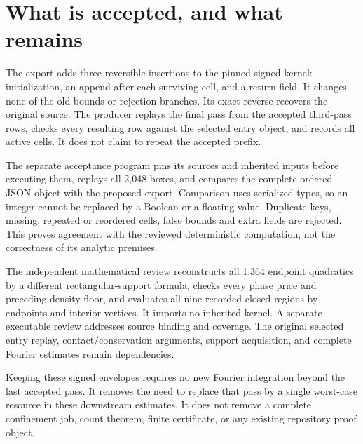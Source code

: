 \documentclass[11pt]{article}
\begin{document}
\section{What is accepted, and what remains}
The export adds three reversible insertions to the pinned signed kernel:
initialization, an append after each surviving cell, and a return field.
It changes none of the old bounds or rejection branches.
Its exact reverse recovers the original source.
The producer replays the final pass from the accepted third-pass rows,
checks every resulting row against the selected entry object, and records
all active cells. It does not claim to repeat the accepted prefix.

The separate acceptance program pins its sources and inherited inputs
before executing them, replays all 2,048 boxes, and compares the complete
ordered JSON object with the proposed export. Comparison uses serialized
types, so an integer cannot be replaced by a Boolean or a floating value.
Duplicate keys, missing, repeated or reordered cells, false bounds and
extra fields are rejected. This proves agreement with the reviewed
deterministic computation, not the correctness of its analytic premises.

The independent mathematical review reconstructs all 1,364 endpoint
quadratics by a different rectangular-support formula, checks every phase
price and preceding density floor, and evaluates all nine recorded closed
regions by endpoints and interior vertices. It imports no inherited
kernel. A separate executable review addresses source binding and coverage.
The original selected entry replay, contact/conservation arguments,
support acquisition, and complete Fourier estimates remain dependencies.

Keeping these signed envelopes requires no new Fourier integration beyond
the last accepted pass. It removes the need to replace that pass by a
single worst-case resource in these downstream estimates. It does not
remove a complete confinement job, count theorem, finite certificate,
or any existing repository proof object.
\end{document}

